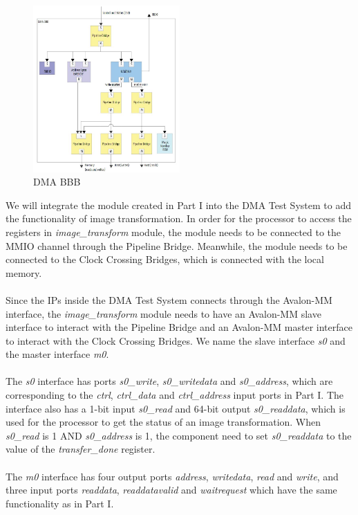 \documentclass[epsfig,10pt,fullpage]{article}
\begin{document}
\begin{figure}[h]
    \centering
    \includegraphics[width=0.5\textwidth]{figures/DMABBB.JPG}
    \caption{DMA BBB}
    \label{fig:dmaBBB}
\end{figure}

\noindent
We will integrate the module created in Part I into the DMA Test System to add the functionality of image transformation. In order for the processor to access the registers in {\it image\_transform} module, the module needs to be connected to the MMIO channel through the Pipeline Bridge. Meanwhile, the module needs to be connected to the Clock Crossing Bridges, which is connected with the local memory.\\
\\
Since the IPs inside the DMA Test System connects through the Avalon-MM interface, the {\it image\_transform} module needs to have an Avalon-MM slave interface to interact with the Pipeline Bridge and an Avalon-MM master interface to interact with the Clock Crossing Bridges. We name the slave interface {\it s0} and the master interface {\it m0}.\\
\\
The {\it s0} interface has ports {\it s0\_write}, {\it s0\_writedata} and {\it s0\_address}, which are corresponding to the {\it ctrl}, {\it ctrl\_data} and {\it ctrl\_address} input ports in Part I. The interface also has a 1-bit input {\it s0\_read} and 64-bit output {\it s0\_readdata}, which is used for the processor to get the status of an image transformation. When {\it s0\_read} is 1 AND {\it s0\_address} is 1, the component need to set {\it s0\_readdata} to the value of the {\it transfer\_done} register.\\
\\
\newpage
The {\it m0} interface has four output ports {\it address}, {\it writedata}, {\it read} and {\it write}, and three input ports {\it readdata}, {\it readdatavalid} and {\it waitrequest} which have the same functionality as in Part I. \\
\\
\end{document}
